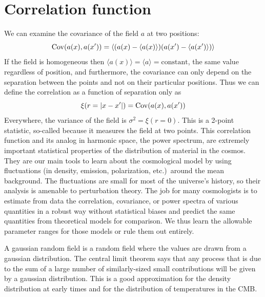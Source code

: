 \section{Correlation function}
We can examine the covariance of the field $a$ at two positions:
\begin{equation}
  {\rm Cov}(a(x),a(x')) = \left\langle (a(x) - \langle a(x) \rangle) (a(x') - \langle a(x') \rangle ) \right\rangle
\end{equation}
If the field is homogeneous then $\langle a(x) \rangle = \langle a \rangle = \mbox{constant}$, the same value regardless of position, and furthermore, the covariance can only depend on the separation between the points and not on their particular positions.  Thus we can define the correlation as a function of separation only as
\begin{equation}
  \xi ( r = |x - x'| ) = {\rm Cov}(a(x),a(x'))
\end{equation}
Everywhere, the variance of the field is $\sigma^2 = \xi(r=0)$.  This is a 2-point statistic, so-called because it measures the field at two points.  This correlation function and its analog in harmonic space, the power spectrum, are extremely important statistical properties of the distribution of material in the cosmos.  They are our main tools to learn about the cosmological model by using fluctuations (in density, emission, polarization, etc.)\ around the mean background.  The fluctuations are small for most of the universe's history, so their analysis is amenable to perturbation theory.  The job for many cosmologists is to estimate from data the correlation, covariance, or power spectra of various quantities in a robust way without statistical biases and predict the same quantities from theoretical models for comparison.  We thus learn the allowable parameter ranges for those models or rule them out entirely.

A gaussian random field is a random field where the values are drawn from a gaussian distribution.  The central limit theorem says that any process that is due to the sum of a large number of similarly-sized small contributions will be given by a gaussian distribution.  This is a good approximation for the density distribution at early times and for the distribution of temperatures in the CMB.

